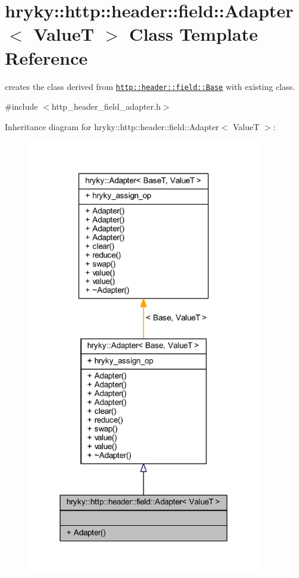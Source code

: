 \hypertarget{classhryky_1_1http_1_1header_1_1field_1_1_adapter}{\section{hryky\-:\-:http\-:\-:header\-:\-:field\-:\-:Adapter$<$ Value\-T $>$ Class Template Reference}
\label{classhryky_1_1http_1_1header_1_1field_1_1_adapter}
}


creates the class derived from \href{http::header::field::Base}{\tt http\-::header\-::field\-::\-Base} with existing class.  




{\ttfamily \#include $<$http\-\_\-header\-\_\-field\-\_\-adapter.\-h$>$}



Inheritance diagram for hryky\-:\-:http\-:\-:header\-:\-:field\-:\-:Adapter$<$ Value\-T $>$\-:
\nopagebreak
\begin{figure}[H]
\begin{center}
\leavevmode
\includegraphics[width=288pt]{classhryky_1_1http_1_1header_1_1field_1_1_adapter__inherit__graph}
\end{center}
\end{figure}
